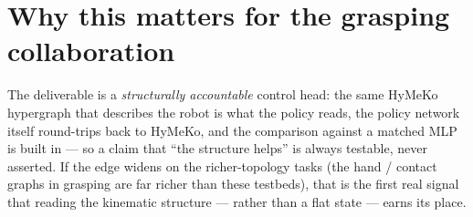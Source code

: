 \documentclass[11pt]{article}
\begin{document}
\section{Why this matters for the grasping collaboration}
The deliverable is a \emph{structurally accountable} control head: the same HyMeKo hypergraph that describes the
robot is what the policy reads, the policy network itself round-trips back to HyMeKo, and the comparison against
a matched MLP is built in --- so a claim that ``the structure helps'' is always testable, never asserted. If the
edge widens on the richer-topology tasks (the hand / contact graphs in grasping are far richer than these
testbeds), that is the first real signal that reading the kinematic structure --- rather than a flat state ---
earns its place.
\end{document}
